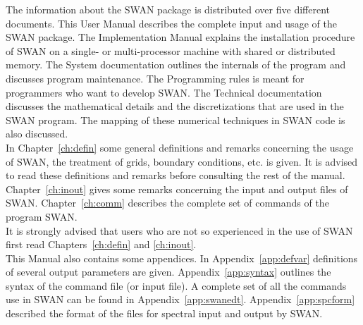 \documentclass[12pt]{book}
\begin{document}
\tableofcontents

 \label{ch:intro}

The information about the SWAN package is distributed over five different documents. This User Manual describes
the complete input and usage of the SWAN package. The Implementation Manual explains the installation procedure
of SWAN on a single- or multi-processor machine with shared or distributed memory. The System documentation outlines
the internals of the program and discusses program maintenance. The Programming rules is meant for programmers
who want to develop SWAN. The Technical documentation discusses the mathematical details and the discretizations
that are used in the SWAN program. The mapping of these numerical techniques in SWAN code is also discussed.
\nocite{Impman,Sysdoc,Progrul,Techdoc}
\\[2ex]
\noindent
In Chapter~\ref{ch:defin} some general definitions and remarks concerning the usage of SWAN, the treatment of grids,
boundary conditions, etc. is given. It is advised to read these definitions and remarks before consulting the rest
of the manual. Chapter~\ref{ch:inout} gives some remarks concerning the input and output files of SWAN.
Chapter~\ref{ch:comm} describes the complete set of commands of the program SWAN.
\\[2ex]
\noindent
It is strongly advised that users who are not so experienced in the use of SWAN first read Chapters~\ref{ch:defin}
and \ref{ch:inout}.
\\[2ex]
\noindent
This Manual also contains some appendices. In Appendix~\ref{app:defvar} definitions of several output parameters are given.
Appendix~\ref{app:syntax} outlines the syntax of the command file (or input file). A complete set of all the commands use
in SWAN can be found in Appendix~\ref{app:swanedt}. Appendix~\ref{app:spcform} described the format of the files for
spectral input and output by SWAN.

 \label{ch:defin}
\end{document}
